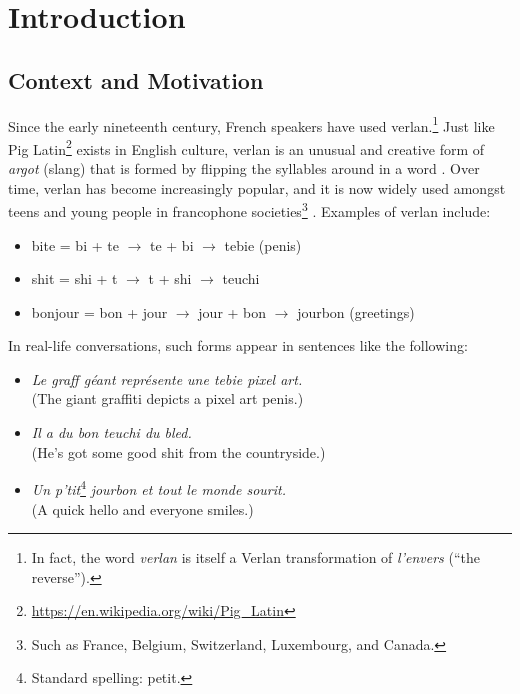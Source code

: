 \documentclass[12pt]{article}
\begin{document}
\section{Introduction}
\subsection{Context and Motivation}

Since the early nineteenth century, French speakers have used verlan.\footnote{In fact, the word \textit{verlan} is itself a Verlan transformation of \textit{l'envers} (``the reverse'').} Just like Pig Latin\footnote{\url{https://en.wikipedia.org/wiki/Pig_Latin}} exists in English culture, verlan is an unusual and creative form of \textit{argot} (slang) that is formed by flipping the syllables around in a word \cite{rajabov2025,bach2018}.
Over time, verlan has become increasingly popular, and it is now widely used amongst teens and young people in francophone societies\footnote{Such as France, Belgium, Switzerland, Luxembourg, and Canada.} \cite{evolutionverlan}. Examples of verlan include:

\begin{flushleft}
\small
\begin{itemize}
  \item bite = bi + te \(\rightarrow\) te + bi \(\rightarrow\) tebie (penis)
  \item shit = shi + t \(\rightarrow\) t + shi \(\rightarrow\) teuchi \cite{evolutionverlan}
  \item bonjour = bon + jour \(\rightarrow\) jour + bon \(\rightarrow\) jourbon (greetings)
\end{itemize}
\end{flushleft}

\noindent In real-life conversations, such forms appear in sentences like the following:

\begin{flushleft}
\small
\begin{itemize}
  \item \textit{Le graff géant représente une tebie pixel art.}\\(The giant graffiti depicts a pixel art penis.)
  \item \textit{Il a du bon teuchi du bled.}\\(He's got some good shit from the countryside.)
  \item \textit{Un p'tit}\footnote{Standard spelling: petit.}\textit{ jourbon et tout le monde sourit.}\\(A quick hello and everyone smiles.)
\end{itemize}
\end{flushleft}
\end{document}

